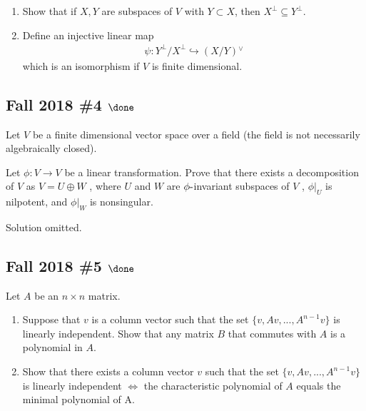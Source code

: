 \begin{enumerate}
\def\labelenumi{\alph{enumi}.}
\item
  Show that if \(X, Y\) are subspaces of \(V\) with \(Y\subset X\), then
  \(X^{\perp} \subseteq Y^{\perp}\).
\item
  Define an injective linear map
  \begin{align*}
  \psi: Y^{\perp}/X^{\perp} \hookrightarrow(X/Y) {}^{ \vee }
  \end{align*}
  which is an isomorphism if \(V\) is finite dimensional.
\end{enumerate}

\hypertarget{fall-2018-4-done}{%
\subsection{\texorpdfstring{Fall 2018 \#4
\(\done\)}{Fall 2018 \#4 \textbackslash done}}\label{fall-2018-4-done}}

Let \(V\) be a finite dimensional vector space over a field (the field
is not necessarily algebraically closed).

Let \(\phi : V \to V\) be a linear transformation. Prove that there
exists a decomposition of \(V\) as \(V = U \oplus W\) , where \(U\) and
\(W\) are \(\phi{\hbox{-}}\)invariant subspaces of \(V\) ,
\({\left.{{\phi}} \right|_{{U}} }\) is nilpotent, and
\({\left.{{\phi}} \right|_{{W}} }\) is nonsingular.


Solution omitted.

\hypertarget{fall-2018-5-done}{%
\subsection{\texorpdfstring{Fall 2018 \#5
\(\done\)}{Fall 2018 \#5 \textbackslash done}}\label{fall-2018-5-done}}

Let \(A\) be an \(n \times n\) matrix.

\begin{enumerate}
\def\labelenumi{\alph{enumi}.}
\item
  Suppose that \(v\) is a column vector such that the set
  \(\{v, Av, . . . , A^{n-1} v\}\) is linearly independent. Show that
  any matrix \(B\) that commutes with \(A\) is a polynomial in \(A\).
\item
  Show that there exists a column vector \(v\) such that the set
  \(\{v, Av, . . . , A^{n-1} v\}\) is linearly independent \(\iff\) the
  characteristic polynomial of \(A\) equals the minimal polynomial of A.
\end{enumerate}

